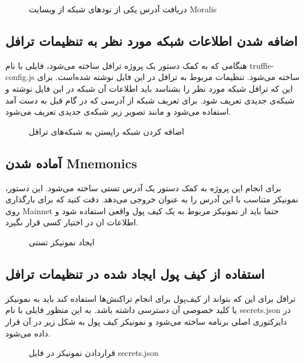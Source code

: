 \begin{figure}[ht]
\centerline{}
\caption{دریافت آدرس یکی از نود‌های شبکه از وبسایت Moralis}
\label{fig:moralis}
\end{figure}

\subsection{اضافه شدن اطلاعات شبکه مورد نظر به تنظیمات ترافل}
هنگامی که به کمک دستور
یک پروژه ترافل ساخته می‌شود، فایلی با نام truffle-config.js ساخته می‌شود. تنظیمات مربوط به ترافل در این فایل نوشته شده‌است. برای این که ترافل شبکه مورد نظر را بشناسد باید اطلاعات آن شبکه در این فایل نوشته و شبکه‌ی جدیدی تعریف شود. برای تعریف شبکه از آدرسی که در گام قبل به دست آمد استفاده می‌شود و مانند تصویر زیر شبکه‌ی جدیدی تعریف می‌شود.

\begin{figure}[ht]
\centerline{}
\caption{اضافه کردن شبکه راپستن به شبکه‌های ترافل}
\label{fig:network-config}
\end{figure}


\subsection{آماده شدن \gls{Mnemonics}}
برای انجام این پروژه به کمک دستور
یک آدرس تستی ساخته می‌شود. این دستور، نمونیکز متناسب با این آدرس را به عنوان خروجی می‌دهد. دقت کنید که برای بارگذاری روی
\gls{Mainnet}
حتما باید از نمونیکز مربوط به یک کیف پول واقعی استفاده شود و اطلاعات ان در اختیار کسی قرار نگیرد.

\begin{figure}[ht]
\centerline{}
\caption{ایجاد نمونیکز تستی}
\label{fig:mnemonics}
\end{figure}


\subsection{استفاده از کیف پول ایجاد شده در تنظیمات ترافل}
ترافل برای این که بتواند از کیف‌پول برای انجام تراکنش‌ها استفاده کند باید به نمونیکز یا کلید خصوصی آن دسترسی داشته باشد. به این منظور فایلی با نام secrets.json در دایرکتوری اصلی برنامه ساخته می‌شود و نمونیکز کیف پول به شکل زیر در آن قرار داده می‌شود.

\begin{figure}[ht]
\centerline{}
\caption{قراردادن نمونیکز در فایل secrets.json}
\label{fig:mnemonics-in-secrets}
\end{figure}

